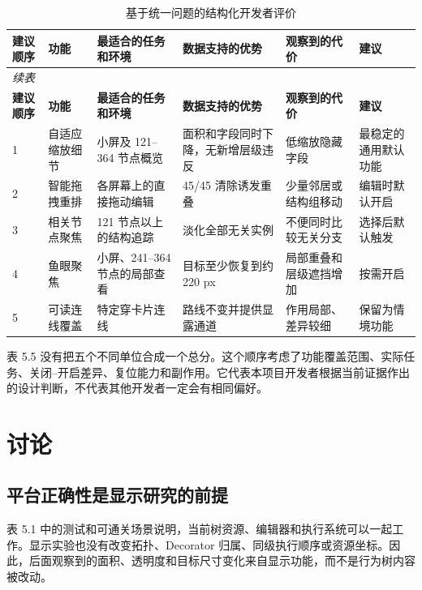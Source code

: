 \documentclass[11pt,a4paper,oneside,extrafontsizes]{memoir}
\begin{document}
\begin{center}
\small
\begin{longtable}{@{}p{} p{} p{} p{} p{} p{}@{}}
\caption{基于统一问题的结构化开发者评价}\label{tab:auto-10}\\
\toprule
\textbf{建议顺序} & \textbf{功能} & \textbf{最适合的任务和环境} & \textbf{数据支持的优势} & \textbf{观察到的代价} & \textbf{建议} \\
\midrule
\endfirsthead
\multicolumn{6}{l}{\small\itshape 续表}\\
\toprule
\textbf{建议顺序} & \textbf{功能} & \textbf{最适合的任务和环境} & \textbf{数据支持的优势} & \textbf{观察到的代价} & \textbf{建议} \\
\midrule
\endhead
1 & 自适应缩放细节 & 小屏及 121–364 节点概览 & 面积和字段同时下降，无新增层级违反 & 低缩放隐藏字段 & 最稳定的通用默认功能 \\
2 & 智能拖拽重排 & 各屏幕上的直接拖动编辑 & 45/45 清除诱发重叠 & 少量邻居或结构组移动 & 编辑时默认开启 \\
3 & 相关节点聚焦 & 121 节点以上的结构追踪 & 淡化全部无关实例 & 不便同时比较无关分支 & 选择后默认触发 \\
4 & 鱼眼聚焦 & 小屏、241–364 节点的局部查看 & 目标至少恢复到约 220 px & 局部重叠和层级遮挡增加 & 按需开启 \\
5 & 可读连线覆盖 & 特定穿卡片连线 & 路线不变并提供显露通道 & 作用局部、差异较细 & 保留为情境功能 \\
\bottomrule
\end{longtable}
\end{center}

表 5.5 没有把五个不同单位合成一个总分。这个顺序考虑了功能覆盖范围、实际任务、关闭–开启差异、复位能力和副作用。它代表本项目开发者根据当前证据作出的设计判断，不代表其他开发者一定会有相同偏好。

\chapter{讨论}

\section{平台正确性是显示研究的前提}

表 5.1 中的测试和可通关场景说明，当前树资源、编辑器和执行系统可以一起工作。显示实验也没有改变拓扑、Decorator 归属、同级执行顺序或资源坐标。因此，后面观察到的面积、透明度和目标尺寸变化来自显示功能，而不是行为树内容被改动。
\end{document}
